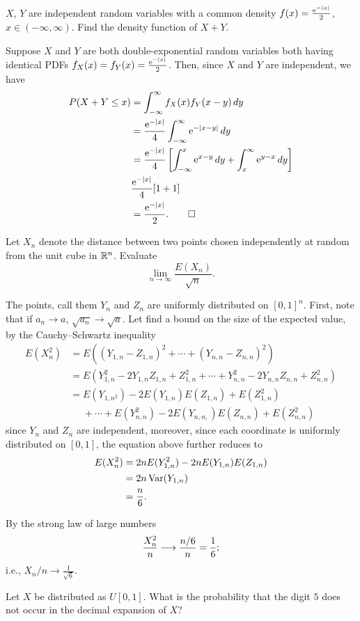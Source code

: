\begin{problem}
  \(X\), \(Y\) are independent random variables with a common density
  \(f(x)=\frac{\mathrm{e}^{-|x|}}{2}\), \(x\in(-\infty,\infty)\). Find the
  density function of \(X+Y\).
\end{problem}
\begin{solution*}
  Suppose \(X\) and \(Y\) are both double-exponential random variables both
  having identical PDFs \(f_X(x)=f_Y(x)=\frac{\mathrm{e}^{-|x|}}{2}\). Then,
  since \(X\) and \(Y\) are independent, we have
  \begin{align*}
    P(X+Y\leq x)
    &=\int_{-\infty}^\infty f_X(x)f_Y(x-y)\mathop{}\!d y\\
    &=\frac{\mathrm{e}^{-|x|}}{4}\int_{-\infty}^\infty\mathrm{e}^{-|x-y|}\mathop{}\!d y\\
    &=\frac{\mathrm{e}^{-|x|}}{4}
      \left[
      \int_{-\infty}^x\mathrm{e}^{x-y}\mathop{}\!d y
      +\int_x^\infty\mathrm{e}^{y-x}\mathop{}\!d y
      \right]\\
    &\frac{\mathrm{e}^{-|x|}}{4}[1+1]\\
    &=\frac{\mathrm{e}^{-|x|}}{2}.\qedhere
  \end{align*}
\end{solution*}

\begin{problem}
  Let \(X_n\) denote the distance between two points chosen independently
  at random from the unit cube in \(\mathbb{R}^n\). Evaluate
  \[
    \lim_{n\to\infty}\frac{E(X_n)}{\sqrt{n}}.
  \]
\end{problem}
\begin{solution*}
  The points, call them \(Y_n\) and \(Z_n\) are uniformly distributed on
  \([0,1]^n\). First, note that if \(a_n\to a\), \(\sqrt{a_n}\to\sqrt{a}\).
  Let find a bound on the size of the expected value, by the
  Cauchy--Schwartz inequality
  \begin{align*}
    E(X_n^2)
    &=E\left((Y_{1,n}-Z_{1,n})^2+\dotsb+(Y_{n,n}-Z_{n,n})^2\right)\\
    &=E\left(Y_{1,n}^2-2Y_{1,n}Z_{1,n}+Z_{1,n}^2
      +\dotsb+
      Y_{n,n}^2-2Y_{n,n}Z_{n,n}+Z_{n,n}^2
      \right)\\
    &=E(Y_{1,n^2})-2E(Y_{1,n})E(Z_{1,n})+E(Z_{1,n}^2)\\
    &\phantom{{}={}}+\dotsb+E(Y_{n,n}^2)-2E(Y_{n,n,})E(Z_{n,n})+E(Z_{n,n}^2)
  \end{align*}
  since \(Y_n\) and \(Z_n\) are independent, moreover, since each
  coordinate is uniformly distributed on \([0,1]\), the equation above
  further reduces to
  \begin{align*}
    E(X_n^2)
    &=2nE(Y_{1,n}^2)-2nE(Y_{1,n})E(Z_{1,n})\\
    &=2n\operatorname{Var}(Y_{1,n})\\
    &=\frac{n}{6}.
  \end{align*}

  By the strong law of large numbers
  \[
    \frac{X_n^2}{n}\longrightarrow\frac{n/6}{n}=\frac{1}{6};
  \]
  i.e., \(X_n/n\to\frac{1}{\sqrt{6}}\).
\end{solution*}

\begin{problem}
  Let \(X\) be distributed as \(U[0,1]\). What is the probability that the
  digit \(5\) does not occur in the decimal expansion of \(X\)?
\end{problem}
\begin{solution*}

\end{solution*}

